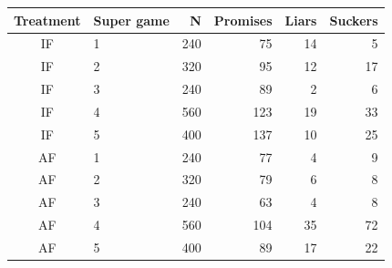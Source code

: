 \begin{tabular}{clrrrr}
  \toprule
Treatment & Super game & N & Promises & Liars & Suckers \\ 
  \midrule
  IF & 1 & 240 &  75 &  14 &   5 \\ 
    IF & 2 & 320 &  95 &  12 &  17 \\ 
    IF & 3 & 240 &  89 &   2 &   6 \\ 
    IF &4 & 560 & 123 &  19 &  33 \\ 
    IF & 5 & 400 & 137 &  10 &  25 \\ 
    \midrule
    AF & 1 & 240 &  77 &   4 &   9 \\ 
    AF &2 & 320 &  79 &   6 &   8 \\ 
    AF & 3 & 240 &  63 &   4 &   8 \\ 
    AF & 4 & 560 & 104 &  35 &  72 \\ 
    AF & 5 & 400 &  89 &  17 &  22 \\ 
   \bottomrule
\end{tabular}
